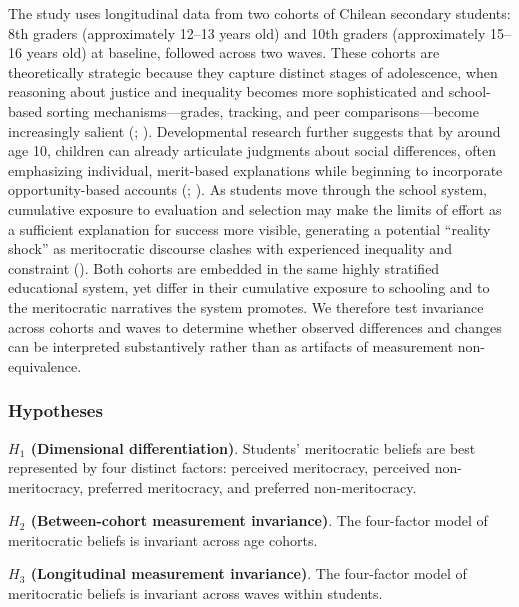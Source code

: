 \documentclass[
  13pt,
]{article}
\begin{document}
The study uses longitudinal data from two cohorts of Chilean secondary
students: 8th graders (approximately 12--13 years old) and 10th graders
(approximately 15--16 years old) at baseline, followed across two waves.
These cohorts are theoretically strategic because they capture distinct
stages of adolescence, when reasoning about justice and inequality
becomes more sophisticated and school-based sorting mechanisms---grades,
tracking, and peer comparisons---become increasingly salient
(;
). Developmental
research further suggests that by around age 10, children can already
articulate judgments about social differences, often emphasizing
individual, merit-based explanations while beginning to incorporate
opportunity-based accounts (; ).
As students move through the school system, cumulative exposure to
evaluation and selection may make the limits of effort as a sufficient
explanation for success more visible, generating a potential ``reality
shock'' as meritocratic discourse clashes with experienced inequality
and constraint (). Both
cohorts are embedded in the same highly stratified educational system,
yet differ in their cumulative exposure to schooling and to the
meritocratic narratives the system promotes. We therefore test
invariance across cohorts and waves to determine whether observed
differences and changes can be interpreted substantively rather than as
artifacts of measurement non-equivalence.

\subsubsection{Hypotheses}\label{hypotheses}

\textbf{\(H_1\) (Dimensional differentiation)}. Students' meritocratic
beliefs are best represented by four distinct factors: perceived
meritocracy, perceived non-meritocracy, preferred meritocracy, and
preferred non-meritocracy.

\textbf{\(H_2\) (Between-cohort measurement invariance)}. The
four-factor model of meritocratic beliefs is invariant across age
cohorts.

\textbf{\(H_3\) (Longitudinal measurement invariance)}. The four-factor
model of meritocratic beliefs is invariant across waves within students.
\end{document}
